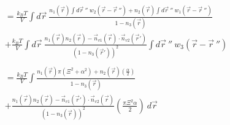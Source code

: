 \documentclass[double,12pt]{beavtex}
\begin{document}
\begin{align} %
          &= \frac{k_BT}{V} \int d\vec r~ \frac{n_1(\vec r)\int d \vec r~''
           ~w_2(\vec r - \vec r~'')
          +n_2(\vec r)\int d \vec r~'' ~w_1(\vec r - \vec r~'')}
          {1-n_3(\vec r)} \nonumber\\
          &+\frac{k_BT}{V} \int d\vec r~\frac{n_1(\vec r)n_2(\vec r)
          -\vec n_{v1}(\vec r)
          \cdot \vec n_{v2}(\vec r')}{(1-n_3(\vec r'))^2} \int d \vec r~'' 
          ~w_3(\vec r - \vec r~'') \\ \nonumber \\
%
           &= \frac{k_BT}{V}\int  \frac{n_1(\vec r)
           \pi(\Xi^2 + \alpha^2)
          +n_2(\vec r)\left(\frac{\alpha}{2}\right)}{1-n_3(\vec r)} 
          \nonumber \\
          &+ \frac{n_1(\vec r)n_2(\vec r)
          -\vec n_{v1}(\vec r')
          \cdot \vec n_{v2}(\vec r)}{(1-n_3(\vec r))^2}
          \left(\frac{\pi\Xi^2\alpha}{2}\right)   ~d\vec r
\end{align}
\end{document}

